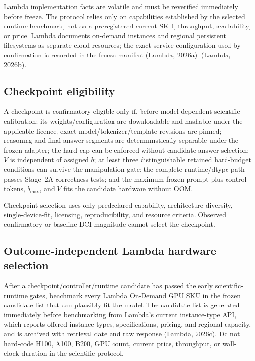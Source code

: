 \documentclass[11pt,a4paper]{article}
\begin{document}
Lambda implementation facts are volatile and must be reverified immediately before freeze. The protocol relies only on capabilities established by the selected runtime benchmark, not on a preregistered current SKU, throughput, availability, or price. Lambda documents on-demand instances and regional persistent filesystems as separate cloud resources; the exact service configuration used by confirmation is recorded in the freeze manifest \href{https://docs.lambda.ai/public-cloud/on-demand/}{(Lambda, 2026a)}; \href{https://docs.lambda.ai/public-cloud/filesystems/}{(Lambda, 2026b)}.

\subsection{Checkpoint eligibility}
A checkpoint is confirmatory-eligible only if, before model-dependent scientific calibration: its weights/configuration are downloadable and hashable under the applicable licence; exact model/tokenizer/template revisions are pinned; reasoning and final-answer segments are deterministically separable under the frozen adapter; the hard cap can be enforced without candidate-answer selection; $V$ is independent of assigned $b$; at least three distinguishable retained hard-budget conditions can survive the manipulation gate; the complete runtime/dtype path passes Stage~2A correctness tests; and the maximum frozen prompt plus control tokens, $b_{\max}$, and $V$ fits the candidate hardware without OOM.

Checkpoint selection uses only predeclared capability, architecture-diversity, single-device-fit, licensing, reproducibility, and resource criteria. Observed confirmatory or baseline DCI magnitude cannot select the checkpoint.

\subsection{Outcome-independent Lambda hardware selection}\label{sec:hardwareselection}
After a checkpoint/controller/runtime candidate has passed the early scientific-runtime gates, benchmark every Lambda On-Demand GPU SKU in the frozen candidate list that can plausibly fit the model. The candidate list is generated immediately before benchmarking from Lambda's current instance-type API, which reports offered instance types, specifications, pricing, and regional capacity, and is archived with retrieval date and raw response \href{https://docs.lambda.ai/public-cloud/cloud-api/}{(Lambda, 2026c)}. Do not hard-code H100, A100, B200, GPU count, current price, throughput, or wall-clock duration in the scientific protocol.
\end{document}
